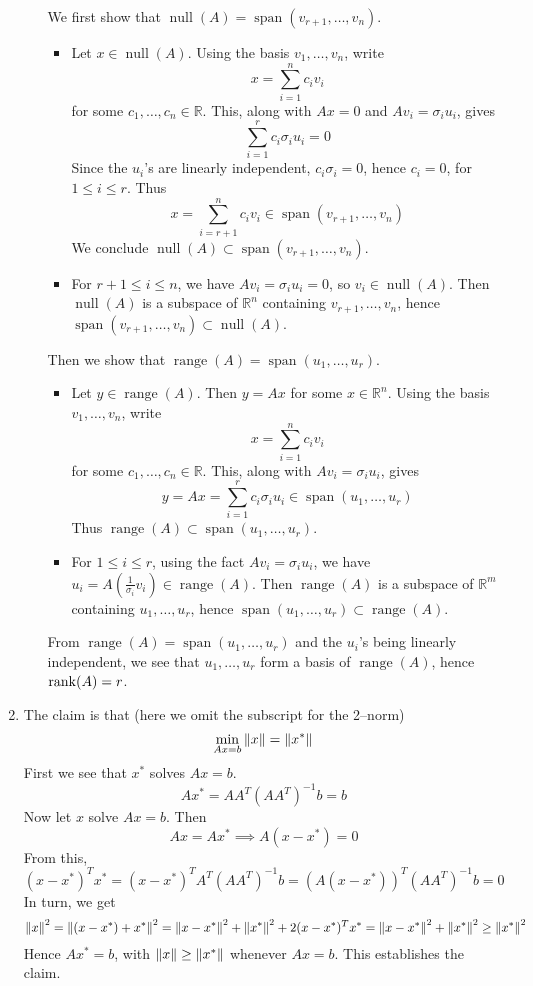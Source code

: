 \documentclass{article}
\def\mbb#1{\mathbb{#1}}
\def\bR{\mbb{R}}
\newcommand{\br}[1]{\left(#1\right)}
\DeclareMathOperator{\Span}{span}
\DeclareMathOperator{\Null}{null}
\DeclareMathOperator{\range}{range}
\newcommand{\s}{\sigma}
\renewcommand{\ss}{\subset}
\newcommand{\inv}{^{-1}}
\newcommand{\imp}{\implies}
\begin{document}
\begin{enumerate}
\begin{enumerate}
		We first show that $\Null(A)=\Span(v_{r+1},\dots,v_n)$.
		\begin{itemize}
			\item Let $x\in\Null(A)$. Using the basis $v_1,\dots,v_n$, write
			\[x=\sum_{i=1}^nc_iv_i\]
			for some $c_1,\dots,c_n\in\bR$. This, along with $Ax=0$ and $Av_i=\s_iu_i$, gives
			\[\sum_{i=1}^r c_i\s_iu_i=0\]
			Since the $u_i$'s are linearly independent, $c_i\s_i=0$, hence $c_i=0$, for $1\le i\le r$. Thus
			\[x=\sum_{i=r+1}^n c_iv_i\in\Span(v_{r+1},\dots,v_n)\] 
			We conclude $\Null(A)\ss\Span(v_{r+1},\dots,v_n)$.
			\item For $r+1\le i\le n$, we have $Av_i=\s_iu_i=0$, so $v_i\in\Null(A)$. Then $\Null(A)$ is a subspace of $\bR^n$ containing $v_{r+1},\dots,v_n$, hence $\Span(v_{r+1},\dots,v_n)\ss\Null(A)$.
		\end{itemize}
	
		Then we show that $\range(A)=\Span(u_1,\dots,u_r)$.
		\begin{itemize}
			\item Let $y\in\range(A)$. Then $y=Ax$ for some $x\in\bR^n$. Using the basis $v_1,\dots,v_n$, write
			\[x=\sum_{i=1}^nc_iv_i\]
			for some $c_1,\dots,c_n\in\bR$. This, along with $Av_i=\s_iu_i$, gives
			\[y=Ax=\sum_{i=1}^r c_i\s_iu_i\in\Span(u_1,\dots,u_r)\]
			Thus $\range(A)\ss\Span(u_1,\dots,u_r)$.
			\item For $1\le i\le r$, using the fact $Av_i=\s_iu_i$, we have $u_i=A\br{\frac{1}{\s_i}v_i}\in\range(A)$. Then $\range(A)$ is a subspace of $\bR^m$ containing $u_1,\dots,u_r$, hence $\Span(u_1,\dots,u_r)\ss\range(A)$.
		\end{itemize}
	
		From $\range(A)=\Span(u_1,\dots,u_r)$ and the $u_i$'s being linearly independent, we see that $u_1,\dots,u_r$ form a basis of $\range(A)$, hence $\rank(A)=r$.
		
		
		
		
	\end{enumerate}

	
	
	\pagebreak
	
	

	\item The claim is that (here we omit the subscript for the 2--norm)
	\[\min_{Ax=b}\norm{x}=\norm{x^*}\]
	First we see that $x^*$ solves $Ax=b$.
	\[Ax^* = AA^T(AA^T)\inv b = b\]
	Now let $x$ solve $Ax=b$. Then
	\[Ax = Ax^*
	\imp A(x-x^*) = 0\]
	From this,
	\[(x-x^*)^Tx^* = (x-x^*)^TA^T(AA^T)\inv b
	= (A(x-x^*))^T(AA^T)\inv b
	= 0\]
	In turn, we get
	\[\norm{x}^2 = \norm{(x-x^*)+x^*}^2
	= \norm{x-x^*}^2 + \norm{x^*}^2 + 2(x-x^*)^Tx^*
	= \norm{x-x^*}^2 + \norm{x^*}^2
	\ge \norm{x^*}^2\]
	Hence $Ax^*=b$, with $\norm{x}\ge\norm{x^*}$ whenever $Ax=b$. This establishes the claim.
	

\end{enumerate}
\end{document}
